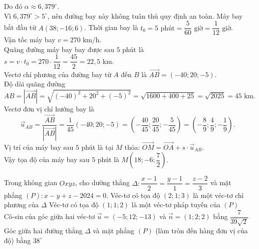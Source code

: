 \begin{ex}
{\begin{itemchoice}
			 Do đó $\alpha \approx 6,379^\circ$.\\
			 Vì $6,379^\circ > 5^\circ$, nên đường bay này không tuân thủ quy định an toàn.
			 \itemch Máy bay bắt đầu từ $A(38; -16; 6)$.
			Thời gian bay là $t_0 = 5 \text{ phút} = \dfrac{5}{60} \text{  giờ} = \dfrac{1}{12} \text{ giờ}$.\\
			Vận tốc máy bay $v = 270 \text{ km/h}$.\\ 
			Quãng đường máy bay bay  được sau $5$ phút là $s = v \cdot t_0 = 270 \cdot \dfrac{1}{12} = \dfrac{45}{2} = 22,5 \text{ km}$.\\
			Vectơ chỉ phương của  đường bay từ $A$ đến $B$ là $\overrightarrow{AB} = (-40; 20; -5)$.\\
			Độ dài quãng  đường $$AB = \left| \overrightarrow{AB}\right| = \sqrt{(-40)^2 + 20^2 + (-5)^2} = \sqrt{1600+400+25} = \sqrt{2025} = 45 \text{ km}.$$
			Vectơ đơn vị chỉ hướng bay là $$\overrightarrow{u}_{AB} = \dfrac{\overrightarrow{AB}}{|\overrightarrow{AB}|} = \dfrac{1}{45}(-40; 20; -5) =  \left(-\dfrac{40}{45}; \dfrac{20}{45}; -\dfrac{5}{45}\right) = \left(-\dfrac{8}{9}; \dfrac{4}{9}; -\dfrac{1}{9}\right).$$
			 Vị trí của máy bay sau $5$ phút là tại $M$ thỏa: $\overrightarrow{OM} = \overrightarrow{OA} + s \cdot \overrightarrow{u}_{AB}$.\\
			Vậy tọa độ của máy  bay sau $5$ phút là $M\left(18; -6; \dfrac{7}{2}\right)$.
		\end{itemchoice}
	} 
\end{ex}

\begin{ex}%
	Trong không gian $Oxyz$, cho dường thẳng $\Delta\colon  \dfrac{x-1}{2}=\dfrac{y-1}{1}=\dfrac{z-2}{3}$ và mặt phẳng $(P)\colon x-y+z-2024=0$.
	 \choiceTF
		{\True Véc-tơ có tọa độ  $(2;1;3)$ là một véc-tơ chỉ phương của $\Delta$}
		{Véc-tơ có tọa độ $(1;1;2)$ là một  véc-tơ pháp tuyến của $(P)$}
		{Cô-sin của góc giữa  hai véc-tơ $\overrightarrow{u}=(-5; 12;-13)$ và $\overrightarrow{n}=(1;2;2)$ bằng $\dfrac{7}{39\sqrt{2}}$}
		{\True Góc giữa hai đường thẳng $\Delta$ và mặt phẳng  $(P)$ (làm tròn đến hàng đơn vị của độ) bằng $38^{\circ}$}
\end{ex}


